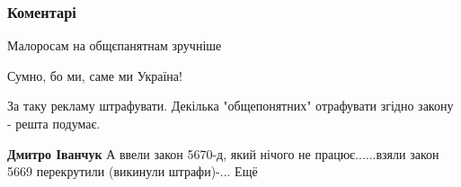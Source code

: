 
 
 
 
 
\subsubsection{Коментарі}

\begin{itemize}
 
Малоросам на общєпанятнам зручніше

 
Сумно, бо ми, саме ми Україна!

 
За таку рекламу штрафувати. Декілька "общепонятних" отрафувати згідно закону - решта подумає.

\begin{itemize}
 
\textbf{Дмитро Іванчук}
А ввели закон 5670-д, який нічого
не працює......взяли закон 5669 перекрутили (викинули штрафи)-... Ещё

 

\end{itemize}
\end{itemize}

